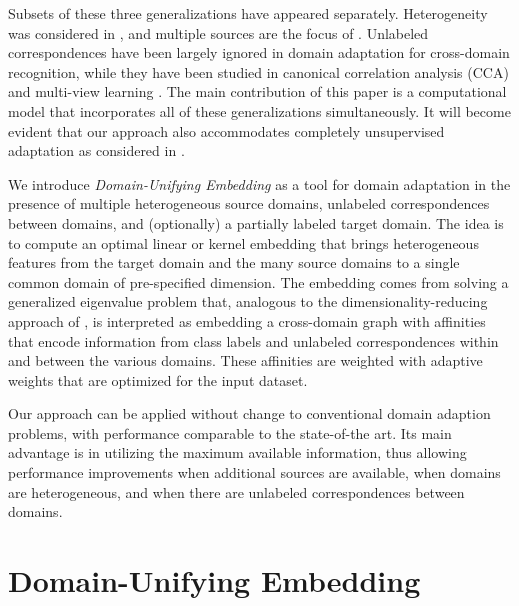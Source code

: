 \documentclass[10pt,twocolumn,letterpaper]{article}
\begin{document}
Subsets of these three generalizations have appeared separately. Heterogeneity was considered in \cite{Shi:heterogeneous,Zhu:heterogeneous,Duan:heterogeneous}, and multiple sources are the focus of \cite{Crammer:multi,Mansour:multi-domain,Chattopadhyay:multi-domain,Duan:multi-SVM,Wang:Manifold}. Unlabeled correspondences have been largely ignored in domain adaptation for cross-domain recognition, while they have been studied in canonical correlation analysis (CCA) \cite{CCA} and multi-view learning \cite{Ruping:multi-view,Sindhwani:multi-view,Zhou:multi-view,Christoudias:multi-view,Amini:multi-view,Harel:multi-view}. The main contribution of this paper is a computational model that incorporates all of these generalizations simultaneously. It will become evident that our approach also accommodates completely unsupervised adaptation as considered in \cite{Gopalan:Grassmann, Gong:Grassmann, Shi:Unsupervised}.

We introduce \emph{Domain-Unifying Embedding} as a tool for domain adaptation in the presence of multiple heterogeneous source domains, unlabeled correspondences between domains, and (optionally) a partially labeled target domain. The idea is to compute an optimal linear or kernel embedding that brings heterogeneous features from the target domain and the many source domains to a single common domain of pre-specified dimension. The embedding comes from solving a generalized eigenvalue problem that, analogous to the dimensionality-reducing approach of \cite{graphembedding}, is interpreted as embedding a cross-domain graph with affinities that encode information from class labels and unlabeled correspondences within and between the various domains. These affinities are weighted with adaptive weights that are optimized for the input dataset.

Our approach can be applied without change to conventional domain adaption problems, with performance comparable to the state-of-the art. Its main advantage is in utilizing the maximum available information, thus allowing performance improvements when additional sources are available, when domains are heterogeneous, and when there are unlabeled correspondences between domains.


\section{Domain-Unifying Embedding}
\end{document}
